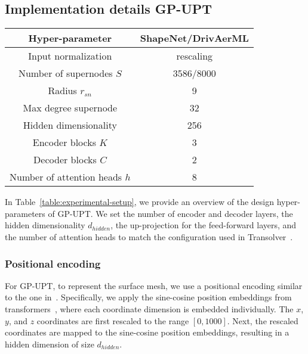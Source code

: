 \subsection{Implementation details GP-UPT}
\begin{table*}[]
\centering
\caption{Hyper-parameter configuration for \ac{GP-UPT}.}
\begin{tabular}{cc}
\hline
Hyper-parameter           & ShapeNet/DrivAerML                    \\ \hline
Input normalization       & rescaling \\
Number of supernodes $S$     & 3586/8000                             \\
Radius $r_{sn}$                        & 9                                     \\
Max degree supernode & 32                                    \\
Hidden dimensionality     & 256                               \\
Encoder blocks $K$          & 3                                   \\
Decoder blocks $C$           & 2                                   \\
Number of attention heads $h$ & 8                                   \\ \hline
\end{tabular}
\label{table:experimental-setup}
\end{table*}
In Table~\ref{table:experimental-setup}, we provide an overview of the design hyper-parameters of \ac{GP-UPT}.
We set the number of encoder and decoder layers, the hidden dimensionality $d_{hidden}$, the up-projection for the feed-forward layers, and the number of attention heads to match the configuration used in Transolver~\cite{wu2024transolver}.

\subsubsection{Positional encoding}
For \ac{GP-UPT}, to represent the surface mesh, we use a positional encoding similar to the one in~\cite{alkin2024universal}. 
Specifically, we apply the sine-cosine position embeddings from transformers~\cite{Vaswani:17}, where each coordinate dimension is embedded individually. 
The $x$, $y$, and $z$ coordinates are first rescaled to the range $[0, 1000]$. 
Next, the rescaled coordinates are mapped to the sine-cosine position embeddings, resulting in a hidden dimension of size $d_{hidden}$.

